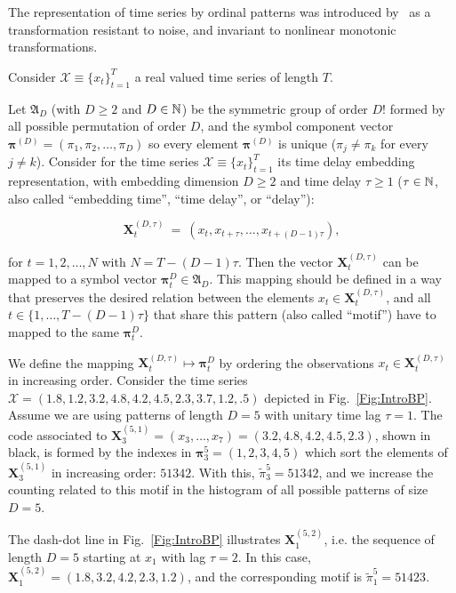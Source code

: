 \documentclass{isprs}
\begin{document}
The representation of time series by ordinal patterns was introduced by~\cite{Bandt2002Permutation} as a transformation resistant to noise, and invariant to nonlinear monotonic transformations.

Consider ${\mathcal X} \equiv \{x_t\}_{t=1}^{T}$ a real valued time series of length $T$. 

Let ${\mathfrak A}_{D}$ (with $D \geq 2$ and $D \in {\Bbb N}$) be the symmetric group of order $D!$ formed by all 
possible permutation of order $D$, and the symbol component vector 
${\bm \pi}^{(D)} = (\pi_1, \pi_2, \dots, \pi_D)$ so every element ${\bm \pi}^{(D)}$ is unique 
($\pi_j \neq \pi_k$ for every $j \neq k$). 
Consider for the time series ${\mathcal X} \equiv \{x_t\}_{t=1}^{T}$ its time delay embedding representation,
with embedding dimension $D \geq 2$ and time delay $\tau \geq 1$ ($\tau \in {\Bbb N}$, also called ``embedding time'', ``time delay'', or ``delay''):

\begin{equation} 
\label{eq:time-delay}
{\mathbf X}^{(D,\tau)}_t ~=~( x_t,x_{t+\tau},\dots,x_{t+(D-1)\tau} ) ,
\end{equation} 

for $t = 1,2,\dots,N$ with $N = T-(D-1) \tau$.
Then the vector ${\mathbf X}^{(D,\tau)}_t$ can be mapped to a symbol vector ${\bm \pi}_t^D \in {\mathfrak A}_{D}$. 
This mapping should be defined in a way that preserves the desired relation between the elements 
$x_t  \in {\mathbf X}^{(D,\tau)}_t$, and all $t \in \{1,\dots,T-(D-1)\tau\}$ that share this pattern (also called ``motif'') have to mapped to the same 
${\bm \pi}_t^{D}$.

We define the mapping ${\mathbf X}_t^{(D,\tau)} \mapsto {\mathbf \pi}_t^{D}$ by ordering the observations $x_t \in {\mathbf X}_t^{(D,\tau)}$ in increasing order.
Consider the time series $\mathcal X = (1.8, 1.2, 3.2, 4.8, 4.2, 4.5, 2.3, 3.7, 1.2, .5)$ depicted in Fig.~\ref{Fig:IntroBP}.
Assume we are using patterns of length $D=5$ with unitary time lag $\tau=1$.
The code associated to $\mathbf X_{3}^{(5,1)}=(x_3,\dots,x_7)=(3.2, 4.8, 4.2, 4.5, 2.3)$, shown in black, is formed by the indexes in $\bm\pi_3^{5}=(1,2,3,4,5)$ which sort the elements of $\mathbf X_{3}^{(5,1)}$ in increasing order: $51342$.
With this, $\widetilde{\pi}_3^{5} = 51342$, and we increase the counting related to this motif in the histogram of all possible patterns of size $D=5$.

The dash-dot line in Fig.~\ref{Fig:IntroBP} illustrates $\mathbf X_{1}^{(5,2)}$, i.e. the sequence of length $D=5$ starting at $x_1$ with lag $\tau=2$.
In this case, $\mathbf X_{1}^{(5,2)}= (1.8, 3.2, 4.2, 2.3, 1.2)$, and the corresponding motif is $\widetilde{\pi}_1^{5}=51423$.
\end{document}
